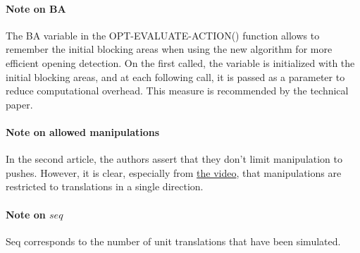 \paragraph{Note on BA}\label{remember_ba_note} The BA variable in the OPT-EVALUATE-ACTION() function allows to remember the initial blocking areas when using the new algorithm for more efficient opening detection. On the first called, the variable is initialized with the initial blocking areas, and at each following call, it is passed as a parameter to reduce computational overhead. This measure is recommended by the technical paper.

\paragraph{Note on allowed manipulations}\label{allowed_manipulations_note} In the second article, the authors assert that they don't limit manipulation to pushes. However, it is clear, especially from \href{https://youtu.be/3AvfPVzBb-s}{the video}, that manipulations are restricted to translations in a single direction.

\paragraph{Note on $seq$}\label{seq_note} Seq corresponds to the number of unit translations that have been simulated.
